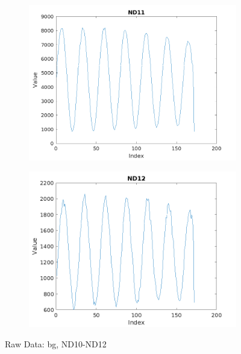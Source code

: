 \documentclass{article}
\numberwithin{equation}{section}
\begin{document}
\begin{figure}[h]
\begin{subfigure}[b]{0.45\textwidth}
        \includegraphics[width=\textwidth]{ND11.png}
    \end{subfigure}
    \hfill
    \begin{subfigure}[b]{0.45\textwidth}
        \includegraphics[width=\textwidth]{ND12.png}
    \end{subfigure}
    \caption{Raw Data: bg, ND10-ND12}
    \label{fig:bg-ND12}
\end{figure}
\end{document}
